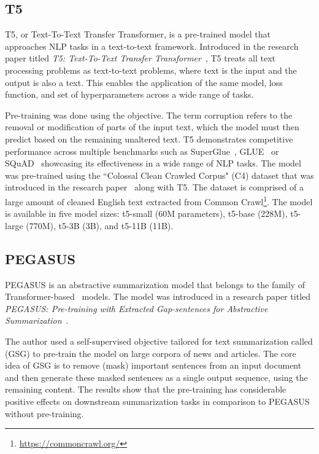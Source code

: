 \documentclass[english, ba, kiv, he, iso690numb, pdf, viewonly]{fasthesis}
\begin{document}
\subsection{T5} \label{subsec:T5}
T5, or Text-To-Text Transfer Transformer, is a pre-trained model that approaches NLP tasks in a text-to-text framework. Introduced in the research paper titled \textit{T5: Text-To-Text Transfer Transformer}~\cite{2020t5}, T5 treats all text processing problems as text-to-text problems, where text is the input and the output is also a text. This enables the application of the same model, loss function, and set of hyperparameters across a wide range of tasks. 

Pre-training was done using the  objective. 
The term corruption refers to the removal or modification of parts of the input text, which the model must then predict based on the remaining unaltered text. T5 demonstrates competitive performance across multiple benchmarks such as SuperGlue~\cite{wang2020superglue}, GLUE~\cite{wang-etal-2018-glue} or SQuAD~\cite{rajpurkar2016squad} showcasing its effectiveness in a wide range of NLP tasks. The model was pre-trained using the “Colossal Clean Crawled Corpus" (C4) dataset that was introduced in the research paper~\cite{2020t5} along with T5. The dataset is comprised of a large amount of cleaned English text extracted from Common Crawl\footnote{\url{https://commoncrawl.org/}}. 
The model is available in five model sizes: t5-small (60M parameters), t5-base (228M), t5-large (770M), t5-3B (3B), and t5-11B (11B).
\subsection{PEGASUS}\label{subsec:pegasus}
PEGASUS is an abstractive summarization model that belongs to the family of Transformer-based~\cite{vaswani2023attention} models. The model was introduced in a research paper titled \textit{PEGASUS: Pre-training with Extracted Gap-sentences for Abstractive Summarization}~\cite{zhang2019pegasus}. 

The author used a self-supervised objective tailored for text summarization called  (GSG) to pre-train the model on large corpora of news and articles. The core idea of GSG is to remove (mask) important sentences from an input document and then generate these masked sentences as a single output sequence, using the remaining content. The results show that the pre-training has considerable positive effects on downstream summarization tasks in comparison to PEGASUS without pre-training. 
\end{document}
